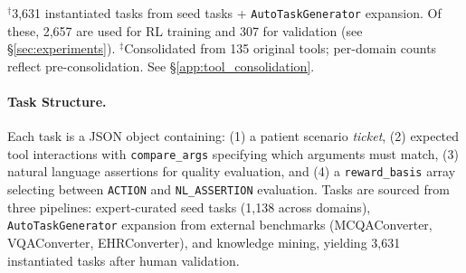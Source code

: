 \documentclass{article}
\newcommand{\gym}{\textsc{Healthcare AI GYM}}
\begin{document}
\begin{table}[h]
\centering
\caption{Medical domains in \gym{} with implementation details.}
\label{tab:domains_appendix}
\vspace{2pt}
{\small $^\dagger$3,631 instantiated tasks from seed tasks + \texttt{AutoTaskGenerator} expansion. Of these, 2,657 are used for RL training and 307 for validation (see \S\ref{sec:experiments}). $^\ddagger$Consolidated from 135 original tools; per-domain counts reflect pre-consolidation. See \S\ref{app:tool_consolidation}.}
\end{table}

\paragraph{Task Structure.}
Each task is a JSON object containing: (1) a patient scenario \emph{ticket}, (2) expected tool interactions with \texttt{compare\_args} specifying which arguments must match, (3) natural language assertions for quality evaluation, and (4) a \texttt{reward\_basis} array selecting between \texttt{ACTION} and \texttt{NL\_ASSERTION} evaluation. Tasks are sourced from three pipelines: expert-curated seed tasks (1,138 across domains), \texttt{AutoTaskGenerator} expansion from external benchmarks (MCQAConverter, VQAConverter, EHRConverter), and knowledge mining, yielding 3,631 instantiated tasks after human validation.
\end{document}
